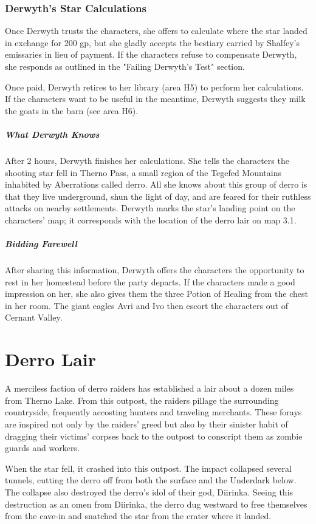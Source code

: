 \documentclass[10pt,a4paper,twoside,bg=print,twocolumn,openany,nodeprecatedcode]{dndbook}
\begin{document}
\subsubsection{Derwyth's Star Calculations}
Once Derwyth trusts the characters, she offers to calculate where the star landed in exchange for 200 gp, but she gladly accepts the bestiary carried by Shalfey's emissaries in lieu of payment. If the characters refuse to compensate Derwyth, she responds as outlined in the "Failing Derwyth's Test" section.

Once paid, Derwyth retires to her library (area H5) to perform her calculations. If the characters want to be useful in the meantime, Derwyth suggests they milk the goats in the barn (see area H6).

\subparagraph{What Derwyth Knows}
After 2 hours, Derwyth finishes her calculations. She tells the characters the shooting star fell in Therno Pass, a small region of the Tegefed Mountains inhabited by Aberrations called derro. All she knows about this group of derro is that they live underground, shun the light of day, and are feared for their ruthless attacks on nearby settlements. Derwyth marks the star's landing point on the characters' map; it corresponds with the location of the derro lair on map 3.1.

\subparagraph{Bidding Farewell}
After sharing this information, Derwyth offers the characters the opportunity to rest in her homestead before the party departs. If the characters made a good impression on her, she also gives them the three Potion of Healing from the chest in her room. The giant eagles Avri and Ivo then escort the characters out of Cernant Valley.

\section{Derro Lair}
A merciless faction of derro raiders has established a lair about a dozen miles from Therno Lake. From this outpost, the raiders pillage the surrounding countryside, frequently accosting hunters and traveling merchants. These forays are inspired not only by the raiders' greed but also by their sinister habit of dragging their victims' corpses back to the outpost to conscript them as zombie guards and workers.

When the star fell, it crashed into this outpost. The impact collapsed several tunnels, cutting the derro off from both the surface and the Underdark below. The collapse also destroyed the derro's idol of their god, Diirinka. Seeing this destruction as an omen from Diirinka, the derro dug westward to free themselves from the cave-in and snatched the star from the crater where it landed.
\end{document}

